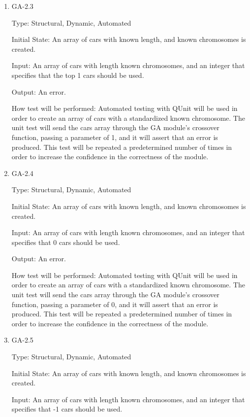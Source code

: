 \documentclass[12pt, titlepage]{article}
\begin{document}
\begin{enumerate}
\item{GA-2.3\\}

Type: Structural, Dynamic, Automated
					
Initial State: An array of cars with known length, and known chromosomes is 
created.
					
Input: An array of cars with length known chromosomes, and an integer that 
specifies that the top 1 cars should be used.
					
Output: An error.
					
How test will be performed: Automated testing with QUnit will be used in order 
to create an array of cars with a standardized known chromosome. The unit test 
will send the cars array through the GA module's crossover function, passing a 
parameter of 1, and it will assert that an error is produced. This test will be 
repeated  a predetermined number of times in order to increase the confidence in 
the correctness of the module.

\item{GA-2.4\\}

Type: Structural, Dynamic, Automated
					
Initial State: An array of cars with known length, and known chromosomes is 
created.
					
Input: An array of cars with length known chromosomes, and an integer that 
specifies that 0 cars should be used.
					
Output: An error.
					
How test will be performed: Automated testing with QUnit will be used in order 
to create an array of cars with a standardized known chromosome. The unit test 
will send the cars array through the GA module's crossover function, passing a 
parameter of 0, and it will assert that an error is produced. This test will be 
repeated  a predetermined number of times in order to increase the confidence in 
the correctness of the module.

\item{GA-2.5\\}

Type: Structural, Dynamic, Automated
					
Initial State: An array of cars with known length, and known chromosomes is 
created.
					
Input: An array of cars with length known chromosomes, and an integer that 
specifies that -1 cars should be used.
					

\end{enumerate}
\end{document}
